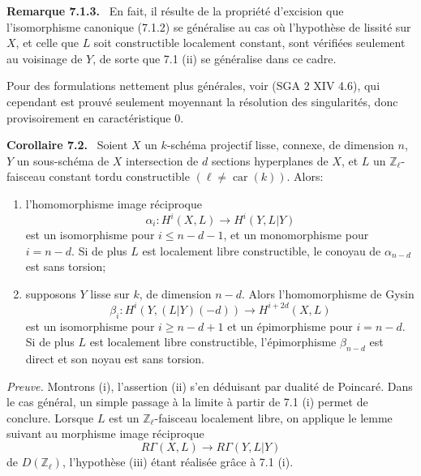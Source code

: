 \documentclass[11pt]{article}
\newenvironment{statement}[1]{\par\medskip\noindent\textbf{#1.}\ }{\par\medskip}
\begin{document}
\begin{statement}{Remarque 7.1.3}
En fait, il résulte de la propriété d'excision que l'isomorphisme canonique (7.1.2) se généralise au cas où l'hypothèse de lissité sur $X$, et celle que $L$ soit constructible localement constant, sont vérifiées seulement au voisinage de $Y$, de sorte que 7.1 (ii) se généralise dans ce cadre.

Pour des formulations nettement plus générales, voir (SGA 2 XIV 4.6), qui cependant est prouvé seulement moyennant la résolution des singularités, donc provisoirement en caractéristique $0$.
\end{statement}

\begin{statement}{Corollaire 7.2}
Soient $X$ un $k$-schéma projectif lisse, connexe, de dimension $n$, $Y$ un sous-schéma de $X$ intersection de $d$ sections hyperplanes de $X$, et $L$ un $\mathbb Z_\ell$-faisceau constant tordu constructible $(\ell\ne\operatorname{car}(k))$. Alors:
\begin{enumerate}[label=(\roman*)]
\item l'homomorphisme image réciproque
\[
\alpha_i:H^i(X,L)\to H^i(Y,L|Y)
\]
est un isomorphisme pour $i\le n-d-1$, et un monomorphisme pour $i=n-d$. Si de plus $L$ est localement libre constructible, le conoyau de $\alpha_{n-d}$ est sans torsion;
\item supposons $Y$ lisse sur $k$, de dimension $n-d$. Alors l'homomorphisme de Gysin
\[
\beta_i:H^i(Y,(L|Y)(-d))\to H^{i+2d}(X,L)
\]
est un isomorphisme pour $i\ge n-d+1$ et un épimorphisme pour $i=n-d$. Si de plus $L$ est localement libre constructible, l'épimorphisme $\beta_{n-d}$ est direct et son noyau est sans torsion.
\end{enumerate}
\end{statement}

\emph{Preuve.} Montrons (i), l'assertion (ii) s'en déduisant par dualité de Poincaré. Dans le cas général, un simple passage à la limite à partir de 7.1 (i) permet de conclure. Lorsque $L$ est un $\mathbb Z_\ell$-faisceau localement libre, on applique le lemme suivant au morphisme image réciproque
\[
R\Gamma(X,L)\to R\Gamma(Y,L|Y)
\]
de $D(\mathbb Z_\ell)$, l'hypothèse (iii) étant réalisée grâce à 7.1 (i).
\end{document}
